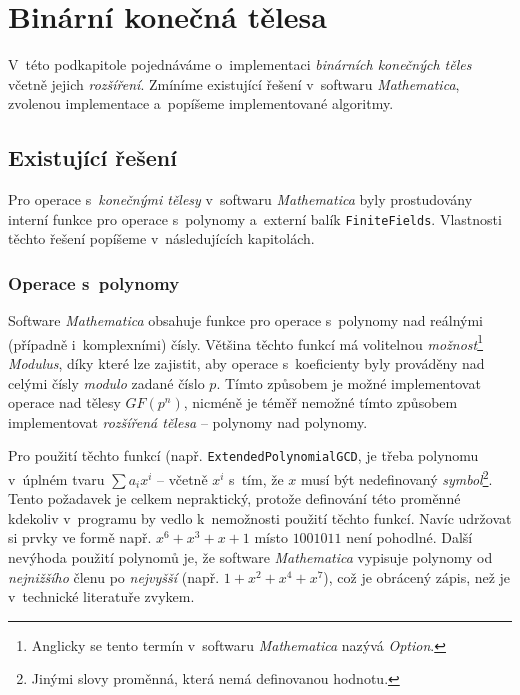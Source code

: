 \documentclass[thesis=M,czech,hidelinks]{FITthesis}[2012/06/26]
\newcommand{\0}{{\textcolor[gray]{0.75}{0}}}
\begin{document}
\section{Binární konečná tělesa}\label{kap_implementace_teles}

V~této podkapitole pojednáváme o~implementaci \emph{binárních konečných těles}
včetně jejich \emph{rozšíření}. Zmíníme existující řešení v~softwaru
\emph{Mathematica}, zvolenou implementace a~popíšeme implementované algoritmy.

\subsection{Existující řešení}

Pro operace s~\emph{konečnými tělesy} v~softwaru \emph{Mathematica} byly
prostudovány interní funkce pro operace s~polynomy a~externí balík
\texttt{FiniteFields}. Vlastnosti těchto řešení popíšeme v~následujících
kapitolách.

\subsubsection{Operace s~polynomy}

Software \emph{Mathematica} obsahuje funkce pro operace s~polynomy nad reálnými
(případně i~komplexními) čísly. Většina těchto funkcí má volitelnou
\emph{možnost}\footnote{
    Anglicky se tento termín v~softwaru \emph{Mathematica} nazývá \emph{Option}.
} \emph{Modulus}, díky které lze zajistit, aby operace s~koeficienty byly
prováděny nad celými čísly \emph{modulo} zadané číslo $p$. Tímto způsobem je
možné implementovat operace nad tělesy $GF(p^n)$, nicméně je téměř nemožné tímto
způsobem implementovat \emph{rozšířená tělesa} -- polynomy nad polynomy.

Pro použití těchto funkcí (např. \texttt{ExtendedPolynomialGCD}, je třeba
polynomu v~úplném tvaru $\sum a_i x^i$ -- včetně $x^i$ s~tím, že $x$ musí být
nedefinovaný \emph{symbol}\footnote{
    Jinými slovy proměnná, která nemá definovanou hodnotu.
}. Tento požadavek je celkem nepraktický, protože definování této proměnné
kdekoliv v~programu by vedlo k~nemožnosti použití těchto funkcí. Navíc udržovat
si prvky ve formě např. $x^6 + x^3 + x + 1$ místo $1001011$ není pohodlné.
Další nevýhoda použití polynomů je, že software \emph{Mathematica} vypisuje
polynomy od \emph{nejnižšího} členu po \emph{nejvyšší} (např. $1+x^2+x^4+x^7$),
což je obrácený zápis, než je v~technické literatuře zvykem.
\end{document}
